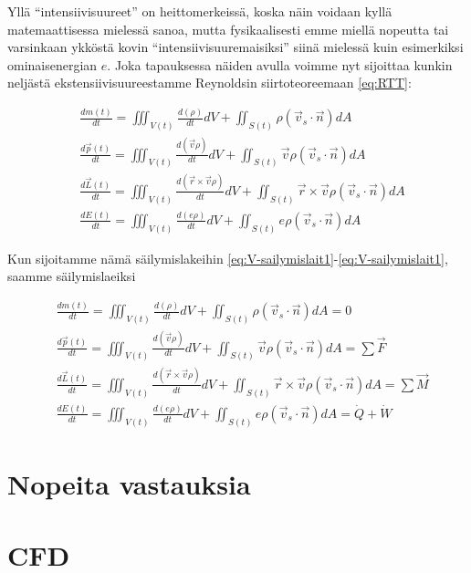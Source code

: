 \documentclass[12pt,a4paper,finnish]{book}
\begin{document}
Yllä ``intensiivisuureet'' on heittomerkeissä, koska näin voidaan kyllä matemaattisessa mielessä sanoa, mutta 
fysikaalisesti emme miellä nopeutta tai varsinkaan ykköstä kovin ``intensiivisuuremaisiksi'' siinä mielessä kuin 
esimerkiksi ominaisenergian $e$. Joka tapauksessa näiden avulla voimme nyt sijoittaa kunkin neljästä 
ekstensiivisuureestamme Reynoldsin siirtoteoreemaan \ref{eq:RTT}:

\begin{align}
 &\frac{dm(t)}{dt}
  = \iiint_{V(t)}\frac{d( \rho)}{dt}dV 
    + \iint_{S(t)} \rho(\vec{v}_s \cdot \vec{n})dA\\
 &\frac{d\vec{p}(t)}{dt}
  = \iiint_{V(t)}\frac{d( \vec{v}\rho)}{dt}dV 
    + \iint_{S(t)} \vec{v}\rho(\vec{v}_s \cdot \vec{n})dA\\
 &\frac{d\vec{L}(t)}{dt}
  = \iiint_{V(t)}\frac{d( \vec{r} \times \vec{v}\rho)}{dt}dV 
    + \iint_{S(t)} \vec{r} \times \vec{v}\rho(\vec{v}_s \cdot \vec{n})dA\\
 &\frac{dE(t)}{dt}
  = \iiint_{V(t)}\frac{d( e\rho)}{dt}dV 
    + \iint_{S(t)} e\rho(\vec{v}_s \cdot \vec{n})dA
\end{align}

Kun sijoitamme nämä säilymislakeihin \ref{eq:V-sailymislait1}-\ref{eq:V-sailymislait1}, saamme 
säilymislaeiksi

\begin{framed}
  \begin{align}
  &\frac{dm(t)}{dt}
    = \iiint_{V(t)}\frac{d( \rho)}{dt}dV 
      + \iint_{S(t)} \rho(\vec{v}_s \cdot \vec{n})dA = 0\\
  &\frac{d\vec{p}(t)}{dt}
    = \iiint_{V(t)}\frac{d( \vec{v}\rho)}{dt}dV 
      + \iint_{S(t)} \vec{v}\rho(\vec{v}_s \cdot \vec{n})dA = \sum \vec{F} \\
  &\frac{d\vec{L}(t)}{dt}
    = \iiint_{V(t)}\frac{d( \vec{r} \times \vec{v}\rho)}{dt}dV 
      + \iint_{S(t)} \vec{r} \times \vec{v}\rho(\vec{v}_s \cdot \vec{n})dA = \sum \vec{M} \\
  &\frac{dE(t)}{dt}
    = \iiint_{V(t)}\frac{d( e\rho)}{dt}dV 
      + \iint_{S(t)} e\rho(\vec{v}_s \cdot \vec{n})dA = \dot{Q} + \dot{W}
  \end{align}
\end{framed}

\section{Nopeita vastauksia}
\section{CFD}
\end{document}
